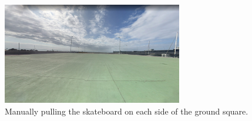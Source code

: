 

\begin{figure}[!h]
    \centering
    \includegraphics[width=0.7\textwidth]{figures/outdoor_field.jpg}
    \caption{ Manually pulling the skateboard on each side of the ground square. }
    \label{fig:outdoor_field}
\end{figure}

